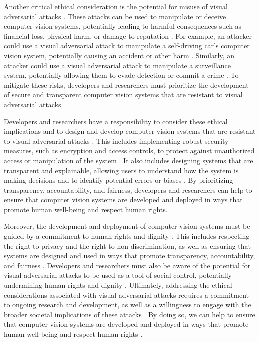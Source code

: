 \documentclass[11pt]{article}
\begin{document}
Another critical ethical consideration is the potential for misuse of visual adversarial attacks \cite{ref156}. These attacks can be used to manipulate or deceive computer vision systems, potentially leading to harmful consequences such as financial loss, physical harm, or damage to reputation \cite{ref121}. For example, an attacker could use a visual adversarial attack to manipulate a self-driving car's computer vision system, potentially causing an accident or other harm \cite{ref3}. Similarly, an attacker could use a visual adversarial attack to manipulate a surveillance system, potentially allowing them to evade detection or commit a crime \cite{ref118}. To mitigate these risks, developers and researchers must prioritize the development of secure and transparent computer vision systems that are resistant to visual adversarial attacks.

Developers and researchers have a responsibility to consider these ethical implications and to design and develop computer vision systems that are resistant to visual adversarial attacks \cite{ref157}. This includes implementing robust security measures, such as encryption and access controls, to protect against unauthorized access or manipulation of the system \cite{ref158}. It also includes designing systems that are transparent and explainable, allowing users to understand how the system is making decisions and to identify potential errors or biases \cite{ref159}. By prioritizing transparency, accountability, and fairness, developers and researchers can help to ensure that computer vision systems are developed and deployed in ways that promote human well-being and respect human rights.

Moreover, the development and deployment of computer vision systems must be guided by a commitment to human rights and dignity \cite{ref160}. This includes respecting the right to privacy and the right to non-discrimination, as well as ensuring that systems are designed and used in ways that promote transparency, accountability, and fairness \cite{ref161}. Developers and researchers must also be aware of the potential for visual adversarial attacks to be used as a tool of social control, potentially undermining human rights and dignity \cite{ref162}. Ultimately, addressing the ethical considerations associated with visual adversarial attacks requires a commitment to ongoing research and development, as well as a willingness to engage with the broader societal implications of these attacks \cite{ref163}. By doing so, we can help to ensure that computer vision systems are developed and deployed in ways that promote human well-being and respect human rights \cite{ref164}.
\end{document}
